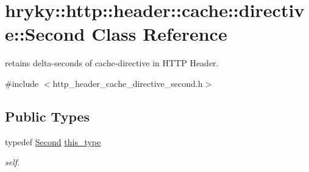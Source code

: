\hypertarget{classhryky_1_1http_1_1header_1_1cache_1_1directive_1_1_second}{\section{hryky\-:\-:http\-:\-:header\-:\-:cache\-:\-:directive\-:\-:Second Class Reference}
\label{classhryky_1_1http_1_1header_1_1cache_1_1directive_1_1_second}
}


retains delta-\/seconds of cache-\/directive in H\-T\-T\-P Header.  




{\ttfamily \#include $<$http\-\_\-header\-\_\-cache\-\_\-directive\-\_\-second.\-h$>$}

\subsection*{Public Types}
\begin{DoxyCompactItemize}
\item 
\hypertarget{classhryky_1_1http_1_1header_1_1cache_1_1directive_1_1_second_a767aa9878f09e259c520df7c27a4d608}{typedef \hyperlink{classhryky_1_1http_1_1header_1_1cache_1_1directive_1_1_second}{Second} \hyperlink{classhryky_1_1http_1_1header_1_1cache_1_1directive_1_1_second_a767aa9878f09e259c520df7c27a4d608}{this\-\_\-type}}\label{classhryky_1_1http_1_1header_1_1cache_1_1directive_1_1_second_a767aa9878f09e259c520df7c27a4d608}

\begin{DoxyCompactList}\small\item\em self. \end{DoxyCompactList}\end{DoxyCompactItemize}
